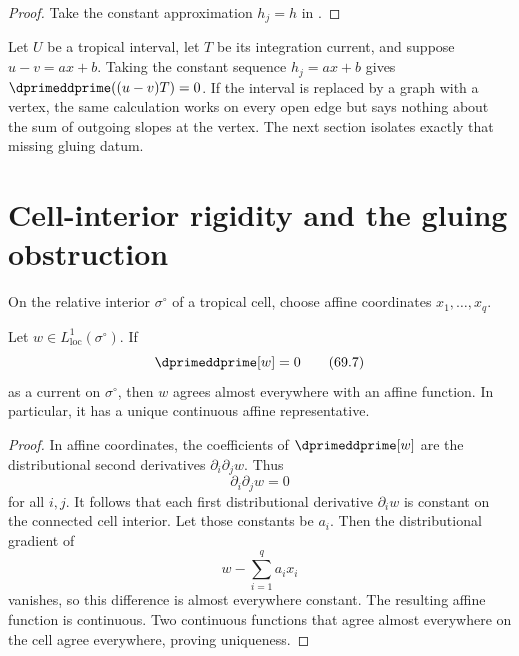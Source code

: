 \begin{proof}
Take the constant approximation $h_j=h$ in
.
\end{proof}

\begin{example}
\label{ex:verified-affine-interval}
Let $U$ be a tropical interval, let $T$ be its integration current, and
suppose $u-v=ax+b$. Taking the constant sequence $h_j=ax+b$ gives
$\dprimeddprime((u-v)T)=0$. If the interval is replaced by a graph with a
vertex, the same calculation works on every open edge but says nothing
about the sum of outgoing slopes at the vertex. The next section isolates
exactly that missing gluing datum.
\end{example}

\section{Cell-interior rigidity and the gluing obstruction}
\label{sec:verified-cross-fan}

On the relative interior $\sigma^\circ$ of a tropical cell, choose
affine coordinates $x_1,\ldots,x_q$.

\begin{proposition}\label{prop:verified-cell-rigidity}
Let $w\in L^1_{\mathrm{loc}}(\sigma^\circ)$. If
\[
                              \dprimeddprime[w]=0
\tag{69.7}\label{eq:verified-cell-harmonic}
\]
as a current on $\sigma^\circ$, then $w$ agrees almost everywhere
with an affine function. In particular, it has a unique continuous
affine representative.
\end{proposition}

\begin{proof}
In affine coordinates, the coefficients of $\dprimeddprime[w]$ are the
distributional second derivatives $\partial_i\partial_jw$. Thus
\[
                         \partial_i\partial_jw=0
\tag{69.8}\label{eq:verified-second-derivatives}
\]
for all $i,j$. It follows that each first distributional derivative
$\partial_iw$ is constant on the connected cell interior. Let those
constants be $a_i$. Then the distributional gradient of
\[
                    w-\sum_{i=1}^qa_ix_i
\]
vanishes, so this difference is almost everywhere constant. The
resulting affine function is continuous. Two continuous functions that
agree almost everywhere on the cell agree everywhere, proving
uniqueness.
\end{proof}

